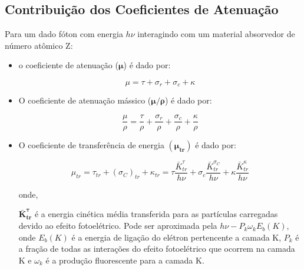 \documentclass[11pt,a4paper]{article}
\begin{document}
        \subsection{Contribuição dos Coeficientes de Atenuação}

            Para um dado fóton com energia $h\nu$ interagindo com um material absorvedor de número atômico Z:
            
            \begin{itemize}
                \item o coeficiente de atenuação ($\mathbf{\mu}$) é dado por:

                    \begin{equation}
                        \mu = \tau + \sigma_r + \sigma_c + \kappa
                    \end{equation}

                \item O coeficiente de atenuação mássico ($\mathbf{\mu/\rho}$) é dado por:
                
                    \begin{equation}
                        \frac{\mu}{\rho} = \frac{\tau}{\rho} + \frac{\sigma_r}{\rho} + \frac{\sigma_c}{\rho} + \frac{\kappa}{\rho}
                    \end{equation}

                \item O coeficiente de transferência de energia $(\mathbf{\mu_{tr}})$ é dado por:
                
                    \begin{equation}
                        \mu_{tr} = \tau_{tr} + (\sigma_C)_{tr} + \kappa_{tr}
                        = \tau \frac{\bar{K}_{tr}^{\tau}}{h\nu} + \sigma_c \frac{\bar{K}_{tr}^{\sigma_C}}{h\nu} + \kappa \frac{\bar{K}_{tr}^{\kappa}}{h\nu}
                    \end{equation}

                \noindent onde,


                \noindent $\mathbf{\bar{K}_{tr}^{\tau}}$ é a energia cinética média transferida para as partículas carregadas devido ao efeito fotoelétrico. Pode ser aproximada pela  $h\nu - P_k \omega_k E_b(K)$, onde $E_b(K)$ é a energia de ligação do elétron pertencente a camada K, $P_k$ é a fração de todas as interações do efeito fotoelétrico que ocorrem na camada K e $\omega_k$ é a produção fluorescente para a camada K.
                


\end{itemize}
\end{document}
